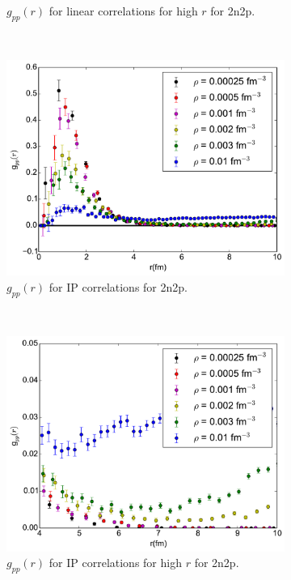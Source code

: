 \documentclass[12pt]{article}
\begin{document}
\begin{figure}[h!]
\begin{subfigure}{0.49\textwidth}
      \caption{$g_{pp}(r)$ for linear correlations for high $r$ for 2n2p.}
   \end{subfigure}
   ~
   \begin{subfigure}{0.49\textwidth}
      \includegraphics[width=\textwidth]{../gpp_ip_alpha.pdf}
      \caption{$g_{pp}(r)$ for IP correlations for 2n2p.}
   \end{subfigure}
   ~
   \begin{subfigure}{0.49\textwidth}
      \includegraphics[width=\textwidth]{../gpp_ip_small_alpha.pdf}
      \caption{$g_{pp}(r)$ for IP correlations for high $r$ for 2n2p.}
   \end{subfigure}
   ~
   \begin{subfigure}{0.49\textwidth}

\end{subfigure}
\end{figure}
\end{document}
